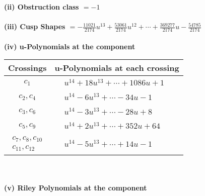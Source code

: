\documentclass[1p]{elsarticle_modified}
\theoremstyle{definition}
\begin{document}
\flushleft \textbf{(ii) Obstruction class $= -1$}\\~\\
\flushleft \textbf{(iii) Cusp Shapes $= -\frac{11021}{2174} u^{13}+\frac{53061}{2174} u^{12}+\cdots+\frac{369277}{2174} u-\frac{54785}{2174}$}\\~\\
\newpage\renewcommand{\arraystretch}{1}
\flushleft \textbf{(iv) u-Polynomials at the component}\newline \\
\begin{tabular}{m{50pt}|m{274pt}}
Crossings & \hspace{64pt}u-Polynomials at each crossing \\
\hline $$\begin{aligned}c_{1}\end{aligned}$$&$\begin{aligned}
&u^{14}+18 u^{13}+\cdots+1086 u+1
\end{aligned}$\\
\hline $$\begin{aligned}c_{2},c_{4}\end{aligned}$$&$\begin{aligned}
&u^{14}-6 u^{13}+\cdots-34 u-1
\end{aligned}$\\
\hline $$\begin{aligned}c_{3},c_{6}\end{aligned}$$&$\begin{aligned}
&u^{14}-3 u^{13}+\cdots-28 u+8
\end{aligned}$\\
\hline $$\begin{aligned}c_{5},c_{9}\end{aligned}$$&$\begin{aligned}
&u^{14}+2 u^{13}+\cdots+352 u+64
\end{aligned}$\\
\hline $$\begin{aligned}c_{7},c_{8},c_{10}\\c_{11},c_{12}\end{aligned}$$&$\begin{aligned}
&u^{14}-5 u^{13}+\cdots+14 u-1
\end{aligned}$\\
\hline
\end{tabular}\\~\\
\newpage\renewcommand{\arraystretch}{1}
\flushleft \textbf{(v) Riley Polynomials at the component}\newline \\
\end{document}
